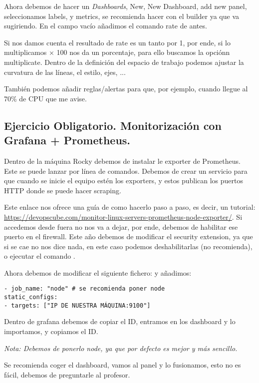 Ahora debemos de hacer un \textit{Dashboards}, New, New Dashboard, add new panel, seleccionamos labels, y metrics, se recomienda hacer con el builder ya que va sugiriendo. En el campo vacío añadimos el comando rate de antes.

Si nos damos cuenta el resultado de rate es un tanto por 1, por ende, si lo multiplicamos $\times$ 100 nos da un porcentaje, para ello buscamos la opciónn multiplicate. Dentro de la definición del espacio de trabajo podemos ajustar la curvatura de las líneas, el estilo, ejes, ...

También podemos añadir reglas/alertas para que, por ejemplo, cuando llegue al 70\% de CPU que me avise.

\subsection{Ejercicio Obligatorio. Monitorización con Grafana + Prometheus.}

Dentro de la máquina Rocky debemos de instalar le exporter de Prometheus. Este se puede lanzar por línea de comandos. Debemos de crear un servicio para que cuando se inicie el equipo estén los exporters, y estos publican los puertos HTTP donde se puede hacer scraping.

Este enlace nos ofrece una guía de como hacerlo paso a paso, es decir, un tutorial: \url{https://devopscube.com/monitor-linux-servers-prometheus-node-exporter/}. Si accedemos desde fuera no nos va a dejar, por ende, debemos de habilitar ese puerto en el firewall. Este año debemos de modificar el security extension, ya que si se cae no nos dice nada, en este caso podemos deshabilitarlas (no recomienda), o ejecutar el comando .

Ahora debemos de modificar el siguiente fichero:  y añadimos: 

\begin{lstlisting}[style=yamlstyle]
  - job_name: "node" # se recomienda poner node
static_configs:
- targets: ["IP DE NUESTRA MÁQUINA:9100"]
\end{lstlisting}

Dentro de grafana debemos de copiar el ID, entramos en los dashboard y lo importamos, y copiamos el ID.

\textit{Nota: Debemos de ponerlo node, ya que por defecto es mejor y más sencillo.}

Se recomienda coger el dashboard, vamos al panel y lo fusionamos, esto no es fácil, debemos de preguntarle al profesor.

